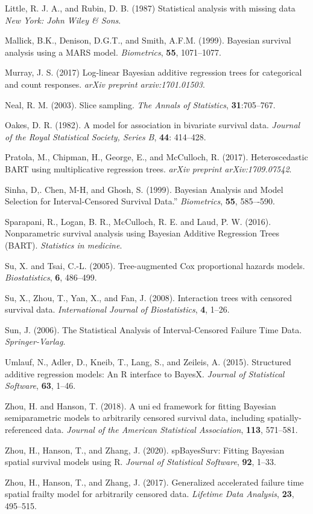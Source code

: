 \documentclass[11pt]{article}
\begin{document}
\begin{thebibliography}{}
\bibitem{ } Little, R. J. A., and Rubin, D. B. (1987) Statistical analysis with missing data \textit{New York: John Wiley \& Sons}.

\bibitem{} Mallick, B.K., Denison, D.G.T., and Smith, A.F.M. (1999). Bayesian survival analysis using a MARS model. \textit{Biometrics}, \textbf{55}, 1071--1077.

\bibitem{ } Murray, J. S. (2017) Log-linear Bayesian additive regression trees for categorical and count responses. \textit{arXiv preprint arxiv:1701.01503}.

\bibitem{ } Neal, R. M. (2003). Slice sampling. \textit{The Annals of Statistics}, \textbf{31}:705–767.

\bibitem{ } Oakes, D. R. (1982). A model for association in bivariate survival data. \textit{Journal of the Royal
 Statistical Society, Series B}, \textbf{44}: 414--428.
 
\bibitem{ } Pratola, M., Chipman, H., George, E., and McCulloch, R. (2017). Heteroscedastic BART using multiplicative regression trees. \textit{arXiv preprint arXiv:1709.07542}.

\bibitem{ } Sinha, D,. Chen, M-H, and 
Ghosh, S. (1999). Bayesian Analysis and Model Selection for Interval-Censored Survival Data.” \textit{Biometrics}, \textbf{55}, 585–-590.

\bibitem{ } Sparapani, R., Logan, B. R., McCulloch, R. E. and Laud, P. W.  (2016). Nonparametric survival analysis using Bayesian Additive Regression Trees (BART). \textit{Statistics in medicine}.

\bibitem{} Su, X. and Tsai, C.-L. (2005). Tree-augmented Cox proportional hazards models. \textit{Biostatistics}, \textbf{6}, 486--499.

\bibitem{} Su, X., Zhou, T., Yan, X., and Fan, J. (2008). Interaction trees with censored survival data. \textit{International Journal of Biostatistics}, \textbf{4}, 1--26.

\bibitem{ } Sun, J. (2006). The Statistical Analysis of Interval-Censored
	Failure Time Data. \textit{Springer-Varlag}.

\bibitem{} Umlauf, N., Adler, D., Kneib, T., Lang, S., and Zeileis, A. (2015). Structured additive regression models: An R interface to BayesX. \textit{Journal of Statistical Software}, \textbf{63}, 1--46.

\bibitem{} Zhou, H. and Hanson, T. (2018). A unied framework for fitting Bayesian semiparametric models to arbitrarily censored survival data, including spatially-referenced data.
\textit{Journal of the American Statistical Association}, \textbf{113}, 571--581.

\bibitem{} Zhou, H., Hanson, T., and Zhang, J. (2020). spBayesSurv: Fitting Bayesian spatial survival
models using R. \textit{Journal of Statistical Software}, \textbf{92}, 1--33.

\bibitem{} Zhou, H., Hanson, T., and Zhang, J. (2017). Generalized accelerated failure time spatial frailty model for arbitrarily censored data. \textit{Lifetime Data Analysis}, \textbf{23}, 495--515.




\end{thebibliography}
\end{document}
